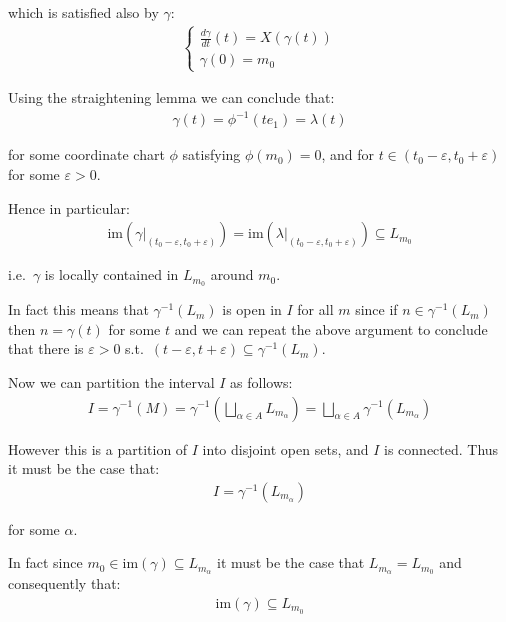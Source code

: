 		which is satisfied also by $\gamma$:
		\begin{align*}
			\begin{cases}
				\frac{d \gamma}{dt}(t) = X(\gamma(t)) \\
				\gamma(0) = m_0
			\end{cases}	
		\end{align*}

		Using the straightening lemma we can conclude that:
		\begin{align*}
			\gamma(t) = \phi^{-1}(t e_1) = \lambda(t)
		\end{align*}

		for some coordinate chart $\phi$ satisfying $\phi(m_0) = 0$, and for $t \in (t_0 - \varepsilon, t_0 + \varepsilon)$ for some $\varepsilon > 0$. \bigskip

		Hence in particular:
		\begin{align*}
			\text{im}(\gamma|_{(t_0 - \varepsilon, t_0 + \varepsilon)}) = \text{im}(\lambda|_{(t_0 - \varepsilon, t_0 + \varepsilon)}) \subseteq L_{m_0}
		\end{align*}

		i.e.\ $\gamma$ is locally contained in $L_{m_0}$ around $m_0$. \bigskip

		In fact this means that $\gamma^{-1}(L_{m})$ is open in $I$ for all $m$ since if $n \in \gamma^{-1}(L_{m})$ then $n = \gamma(t)$ for some $t$ and we can repeat the above argument to conclude that there is $\varepsilon > 0$ s.t.\ $(t - \varepsilon, t + \varepsilon) \subseteq \gamma^{-1}(L_m)$. \bigskip

		Now we can partition the interval $I$ as follows:
		\begin{align*}
			I = \gamma^{-1}(M) = \gamma^{-1}\left(\bigsqcup_{\alpha \in A} L_{m_\alpha}\right) = \bigsqcup_{\alpha \in A} \gamma^{-1}(L_{m_\alpha})
		\end{align*}

		However this is a partition of $I$ into disjoint open sets, and $I$ is connected. Thus it must be the case that:
		\begin{align*}
			I = \gamma^{-1}(L_{m_\alpha})
		\end{align*}

		for some $\alpha$. \bigskip

		In fact since $m_0 \in \text{im}(\gamma) \subseteq L_{m_\alpha}$ it must be the case that $L_{m_\alpha} = L_{m_0}$ and consequently that:
		\begin{align*}
			\text{im}(\gamma) \subseteq L_{m_0}
		\end{align*}

